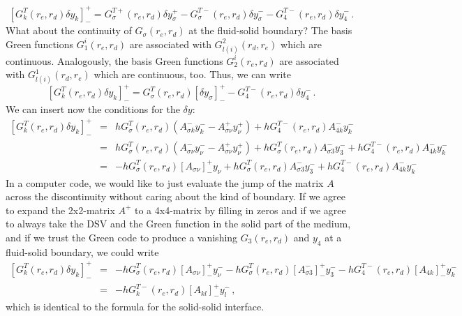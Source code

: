 \documentclass[11pt,a4paper]{article}
\begin{document}
\begin{equation}
\left[G_k^T(r_e,r_d)\delta y_k\right]^+_-   =  G_\sigma^{T+}(r_e,r_d)\delta y_\sigma^+ - G_\sigma^{T-}(r_e,r_d)\delta y_\sigma^- - G_4^{T-}(r_e,r_d)\delta y_4^- \,.
\end{equation}
What about the continuity of $G_\sigma(r_e,r_d)$ at the fluid-solid boundary? The basis Green functions $G_1^i(r_e,r_d)$ are associated with $G_{l(i)}^2(r_d,r_e)$ which are continuous. Analogously, the basis Green functions $G_2^i(r_e,r_d)$ are associated with $G_{l(i)}^1(r_d,r_e)$ which are continuous, too. Thus, we can write
\begin{equation}
\left[G_k^T(r_e,r_d)\delta y_k\right]^+_-   =  G_\sigma^{T}(r_e,r_d)\left[\delta y_\sigma\right]^+_- - G_4^{T-}(r_e,r_d)\delta y_4^- \,.
\end{equation}
We can insert now the conditions for the $\delta y$:
\begin{eqnarray}
\left[G_k^T(r_e,r_d)\delta y_k\right]^+_-  & = & hG_\sigma^{T}(r_e,r_d)\left(A^-_{\sigma k} y^-_k -A^+_{\sigma\nu} y^+_\nu\right) + h G_4^{T-}(r_e,r_d) A_{4k}^- y_k^- \nonumber \\
& = & hG_\sigma^{T}(r_e,r_d)\left(A^-_{\sigma\nu} y^-_\nu -A^+_{\sigma\nu} y^+_\nu\right) + hG_\sigma^{T}(r_e,r_d)A^-_{\sigma 3}y^-_3 + h G_4^{T-}(r_e,r_d) A_{4k}^- y_k^- \nonumber \\
& = & -hG_\sigma^{T}(r_e,r_d)[A_{\sigma\nu}]^+_- y_\nu + hG_\sigma^{T}(r_e,r_d)A^-_{\sigma 3}y^-_3 + h G_4^{T-}(r_e,r_d) A_{4k}^- y_k^-
\end{eqnarray}
In a computer code, we would like to just evaluate the jump of the matrix $A$ across the discontinuity without caring about the kind of boundary. If we agree to expand the 2x2-matrix $A^+$ to a 4x4-matrix by filling in zeros and if we agree to always take the DSV and the Green function in the solid part of the medium, and if we trust the Green code to produce a vanishing $G_3(r_e,r_d)$ and $y_4$ at a fluid-solid boundary, we could write
\begin{eqnarray}
\left[G_k^T(r_e,r_d)\delta y_k\right]^+_-  & = & -hG_\sigma^{T}(r_e,r_d)[A_{\sigma\nu}]^+_- y_\nu^- - hG_\sigma^{T}(r_e,r_d)[A^-_{\sigma 3}]^+_- y^-_3 - h G_4^{T-}(r_e,r_d) [A_{4k}]^+_- y_k^- \nonumber \\
& = & -hG_k^{T-}(r_e,r_d)[A_{kl}]^+_- y_l^- \,,
\end{eqnarray}
which is identical to the formula for the solid-solid interface.
%
\end{document}
